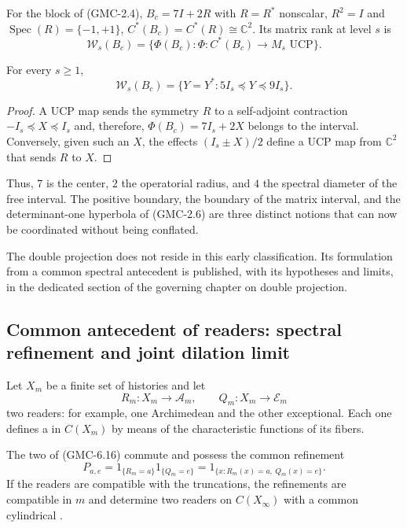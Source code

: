 For the block of \textup{(GMC-2.4)},
$B_c=7I+2R$ with $R=R^*$ nonscalar, $R^2=I$ and
$\operatorname{Spec}(R)=\{-1,+1\}$,
$C^*(B_c)=C^*(R)\cong\mathbb C^2$. Its matrix rank at level $s$ is
\[
 \mathcal W_s(B_c)=
 \{\Phi(B_c):\Phi:C^*(B_c)\to M_s\text{ UCP}\}.
\]

\begin{theorem}
\label{p12-83-c22-s1:gmc:thm:intervalo-bc}
For every $s\ge1$,
\[
 \boxed{\ 
 \mathcal W_s(B_c)
 =\{Y=Y^*:5I_s\preceq Y\preceq9I_s\}.
 \ }
 \tag{GMC-6.15}
\]
\end{theorem}

\begin{proof}
A UCP map sends the symmetry $R$ to a self-adjoint contraction
$-I_s\preceq X\preceq I_s$ and, therefore,
$\Phi(B_c)=7I_s+2X$ belongs to the interval. Conversely, given such an $X$,
the effects $(I_s\pm X)/2$ define a UCP map from $\mathbb C^2$ that sends
$R$ to $X$.
\end{proof}

Thus, $7$ is the center, $2$ the operatorial radius, and $4$ the spectral diameter
of the free interval. The positive boundary, the boundary of the matrix interval, and the
determinant-one hyperbola of \textup{(GMC-2.6)} are three distinct notions that
can now be coordinated without being conflated.

The double projection does not reside in this early classification. Its formulation
from a common spectral antecedent is published, with its hypotheses and limits,
in the dedicated section of the governing chapter on double projection.
\fi

\ifdefined\HMTGMCDoubleProjection
\subsection{Common antecedent of readers: spectral refinement and joint dilation limit}

Let $X_m$ be a finite set of histories and let
\[
 R_m:X_m\to\mathcal A_m,
 \qquad
 Q_m:X_m\to\mathcal E_m
 \tag{GMC-6.16}
\]
two readers: for example, one Archimedean and the other exceptional. Each one
defines a \PVM in $C(X_m)$ by means of the characteristic functions of its
fibers.

\begin{proposition}
\label{p12-83-c22-s1:gmc:prop:doble-proyeccion-conmutativa}
The two \PVM of \textup{(GMC-6.16)} commute and possess the common refinement
\[
 P_{a,e}=1_{\{R_m=a\}}1_{\{Q_m=e\}}
 =1_{\{x:R_m(x)=a,\ Q_m(x)=e\}}.
 \tag{GMC-6.17}
\]
If the readers are compatible with the truncations, the refinements are
compatible in $m$ and determine two readers on $C(X_\infty)$ with a
common cylindrical \PVM.
\end{proposition}

